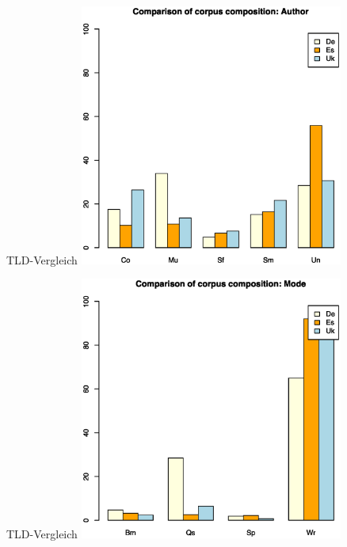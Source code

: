 \begin{frame}
  {TLD-Vergleich}
  \centering
  \includegraphics[width=0.65\textwidth]{graphics/aut}
\end{frame}

\begin{frame}
  {TLD-Vergleich}
  \centering
  \includegraphics[width=0.65\textwidth]{graphics/mode}
\end{frame}


